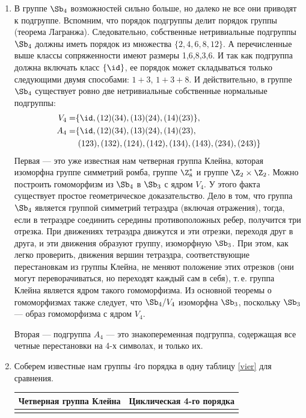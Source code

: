 \begin{enumerate}
\item В группе $\Sb_4$ возможностей сильно больше, но далеко не все они приводят к подгруппе. Вспомним, что порядок подгруппы делит порядок группы (теорема Лагранжа). Следовательно, собственные нетривиальные подгруппы $\Sb_4$ должны иметь порядок из множества $\{2,4,6,8,12\}$. А перечисленные выше классы сопряженности имеют размеры 1,6,8,3,6. И так как подгруппа должна включать класс $\{\id\}$, ее порядок может складываться только следующими двумя способами: $1+3$, $1+3+8$. И действительно, в группе $\Sb_4$ существует ровно две нетривиальные собственные нормальные подгруппы:
\begin{align*}
V_4 = & \{\id,(12)(34),(13)(24),(14)(23)\},\\
A_4 = & \{\id,(12)(34),(13)(24),(14)(23), \\
      & \;(123),(132),(124),(142),(134),(143),(234),(243)\}
\end{align*}
Первая --- это уже известная нам четверная группа Клейна, которая изоморфна группе симметрий ромба, группе $\Z_8^*$ и группе $\Z_2\times\Z_2$. Можно построить гомоморфизм из $\Sb_4$ в $\Sb_3$ с ядром $V_4$. У этого факта существует простое геометрическое доказательство. Дело в том, что группа $\Sb_4$ является группой симметрий тетраэдра (включая отражения), тогда, если в тетраэдре соединить середины противоположных ребер, получится три отрезка. При движениях тетраэдра движутся и эти отрезки, переходя друг в друга, и эти движения образуют группу, изоморфную $\Sb_3$. При этом, как легко проверить, движения вершин тетраэдра, соответствующие перестановкам из группы Клейна, не меняют положение этих отрезков (они могут переворачиваться, но переходят каждый сам в себя), т.\,е. группа Клейна является ядром такого гомоморфизма. Из основной теоремы о гомоморфизмах также следует, что $\Sb_4/V_4$ изоморфна $\Sb_3$, поскольку $\Sb_3$ --- образ гомоморфизма с ядром $V_4$.

Вторая --- подгруппа $A_4$ --- это знакопеременная подгруппа, содержащая все четные перестановки на 4-х символах, и только их.

\item Соберем известные нам группы 4го порядка в одну таблицу \ref{vier} для сравнения.

\begin{table}[h!]
\begin{tabular}{c||c}
Четверная группа Клейна & Циклическая 4-го порядка \\ \hline\hline
\\


\end{tabular}
\end{table}
\end{enumerate}

